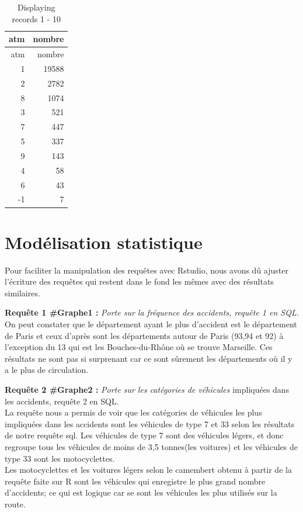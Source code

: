 \documentclass[mstat,12pt]{unswthesis}
\begin{document}
\begin{longtable}[]{@{}rr@{}}
\caption{Displaying records 1 - 10}\tabularnewline
\toprule()
atm & nombre \\
\midrule()
\endfirsthead
\toprule()
atm & nombre \\
\midrule()
\endhead
1 & 19588 \\
2 & 2782 \\
8 & 1074 \\
3 & 521 \\
7 & 447 \\
5 & 337 \\
9 & 143 \\
4 & 58 \\
6 & 43 \\
-1 & 7 \\
\bottomrule()
\end{longtable}

\bigskip

\hypertarget{moduxe9lisation-statistique}{%
\chapter{Modélisation statistique}\label{moduxe9lisation-statistique}}

Pour faciliter la manipulation des requêtes avec Rstudio, nous avons dû
ajuster l'écriture des requêtes qui restent dans le fond les mêmes avec
des résultats similaires.

\medskip

\textbf{Requête 1 \#Graphe1 :} \emph{Porte sur la fréquence des
accidents, requête 1 en SQL.}\\
On peut constater que le département ayant le plus d'accident est le
département de Paris et ceux d'après sont les départements autour de
Paris (93,94 et 92) à l'exception du 13 qui est les Bouches-du-Rhône où
se trouve Marseille. Ces résultats ne sont pas si surprenant car ce sont
sûrement les départements où il y a le plus de circulation.

\medskip

\textbf{Requête 2 \#Graphe2 :} \emph{Porte sur les catégories de
véhicules} impliquées dans les accidents, requête 2 en SQL.\\
La requête nous a permis de voir que les catégories de véhicules les
plus impliquées dans les accidents sont les véhicules de type 7 et 33
selon les résultats de notre requête sql. Les véhicules de type 7 sont
des véhicules légers, et donc regroupe tous les véhicules de moins de
3,5 tonnes(les voitures) et les véhicules de type 33 sont les
motocyclettes.\\
Les motocyclettes et les voitures légers selon le camembert obtenu à
partir de la requête faite sur R sont les véhicules qui enregistre le
plus grand nombre d'accidents; ce qui est logique car se sont les
véhicules les plus utilisés sur la route.
\end{document}
